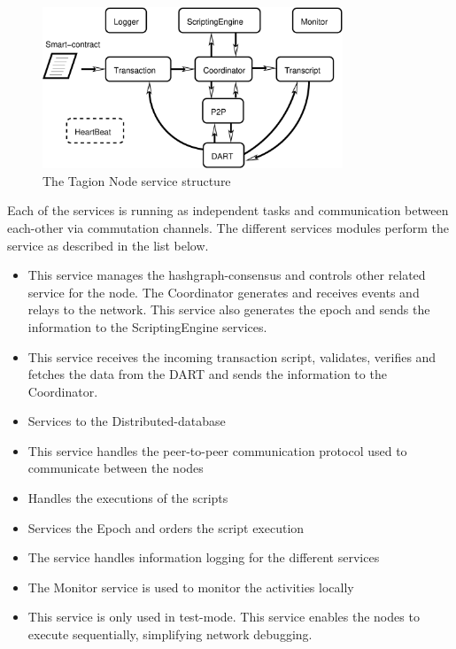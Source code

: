 \begin{figure}[H]
	\centering
	\includegraphics[width=0.8\textwidth]{fig/node_service.eps}
	\caption{The Tagion Node service structure}
	\label{fig:node_service}
\end{figure}


Each of the services is running as independent tasks and communication between each-other via commutation channels. The different services modules perform the service as described in the list below.

\begin{itemize}
	\item[\bfit{Coordinator}] This service manages the hashgraph-consensus and controls other related service for the node. 
	The Coordinator generates and receives events and relays to the network. This service also generates the epoch and sends the information to the ScriptingEngine services.
	\item[\bfit{Transaction}] This service receives the incoming transaction script, validates, verifies and fetches the data from the DART and sends the information to the Coordinator.
	\item[\bfit{DART}] Services to the Distributed-database
	\item[\bfit{P2P}] This service handles the peer-to-peer communication protocol used to communicate between the nodes
	\item[\bfit{ScriptingEngine}] Handles the executions of the scripts
	\item[\bfit{Transcript}] Services the Epoch and orders the script execution
	\item[\bfit{Logger}] The service handles information logging for the different services
	\item[\bfit{Monitor}] The Monitor service is used to monitor the activities locally
	\item[\bfit{HeartBeat}] This service is only used in test-mode. This service enables the nodes to execute sequentially, simplifying network debugging.
\end{itemize}

